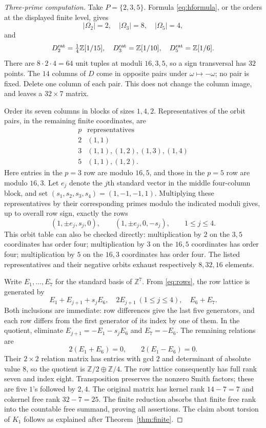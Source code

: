 \documentclass[11pt]{article}
\newcommand{\Z}{\mathbb Z}
\theoremstyle{definition}
\theoremstyle{remark}
\begin{document}
\begin{proof}[Three-prime computation]
Take $P=\{2,3,5\}$. Formula \eqref{eq:hformula}, or the orders at the displayed finite level, gives
\[
 |\Omega_2|=2,\quad |\Omega_3|=8,\quad |\Omega_5|=4,
\]
and
\[
 D_2^{\rm rat}=\tfrac14\Z[1/15],\quad
 D_3^{\rm rat}=\Z[1/10],\quad
 D_5^{\rm rat}=\Z[1/6].
\]
There are $8\cdot2\cdot4=64$ unit tuples at moduli $16,3,5$, so a sign transversal has $32$ points. The $14$ columns of $D$ come in opposite pairs under $\omega\mapsto-\omega$; no pair is fixed. Delete one column of each pair. This does not change the column image, and leaves a $32\times7$ matrix.

Order its seven columns in blocks of sizes $1,4,2$. Representatives of the orbit pairs, in the remaining finite coordinates, are
\[
 \begin{array}{c|l}
 p&\text{representatives}\\\hline
 2&(1,1)\\
 3&(1,1),(1,2),(1,3),(1,4)\\
 5&(1,1),(1,2).
 \end{array}
\]
Here entries in the $p=3$ row are modulo $16,5$, and those in the $p=5$ row are modulo $16,3$. Let $e_j$ denote the $j$th standard vector in the middle four-column block, and set $(s_1,s_2,s_3,s_4)=(1,-1,-1,1)$. Multiplying these representatives by their corresponding primes modulo the indicated moduli gives, up to overall row sign, exactly the rows
\begin{equation}\label{eq:rows}
 (1,\pm e_j,s_j,0),
 \qquad (1,\pm e_j,0,-s_j),\qquad 1\leq j\leq4.
\end{equation}
This orbit table can also be checked directly: multiplication by $2$ on the $3,5$ coordinates has order four; multiplication by $3$ on the $16,5$ coordinates has order four; multiplication by $5$ on the $16,3$ coordinates has order four. The listed representatives and their negative orbits exhaust respectively $8,32,16$ elements.

Write $E_1,\ldots,E_7$ for the standard basis of $\Z^7$. From \eqref{eq:rows}, the row lattice is generated by
\[
 E_1+E_{j+1}+s_jE_6,\quad 2E_{j+1}\ (1\leq j\leq4),
 \quad E_6+E_7.
\]
Both inclusions are immediate: row differences give the last five generators, and each row differs from the first generator of its index by one of them. In the quotient, eliminate $E_{j+1}=-E_1-s_jE_6$ and $E_7=-E_6$. The remaining relations are
\[
 2(E_1+E_6)=0,\qquad2(E_1-E_6)=0.
\]
Their $2\times2$ relation matrix has entries with gcd $2$ and determinant of absolute value $8$, so the quotient is $\Z/2\oplus\Z/4$. The row lattice consequently has full rank seven and index eight. Transposition preserves the nonzero Smith factors; these are five $1$'s followed by $2,4$. The original matrix has kernel rank $14-7=7$ and cokernel free rank $32-7=25$. The finite reduction absorbs that finite free rank into the countable free summand, proving all assertions. The claim about torsion of $K_1$ follows as explained after Theorem~\ref{thm:finite}.
\end{proof}
\end{document}
